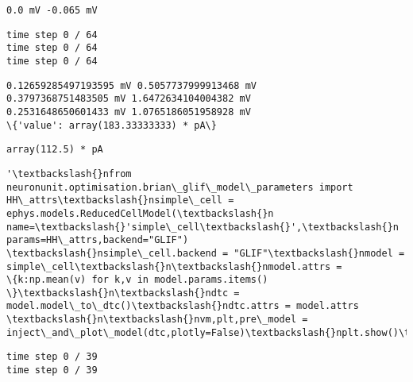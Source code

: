 \documentclass[11pt]{article}
\begin{document}
    \begin{Verbatim}[commandchars=\\\{\}]
0.0 mV -0.065 mV
    \end{Verbatim}

    \begin{Verbatim}[commandchars=\\\{\}]
time step 0 / 64
time step 0 / 64
time step 0 / 64
    \end{Verbatim}

    \begin{Verbatim}[commandchars=\\\{\}]
0.12659285497193595 mV 0.5057737999913468 mV
0.3797368751483505 mV 1.6472634104004382 mV
0.2531648650601433 mV 1.0765186051958928 mV
\{'value': array(183.33333333) * pA\}
    \end{Verbatim}

            \begin{tcolorbox}[breakable, size=fbox, boxrule=.5pt, pad at break*=1mm, opacityfill=0]
\begin{Verbatim}[commandchars=\\\{\}]
array(112.5) * pA
\end{Verbatim}
\end{tcolorbox}
        
            \begin{tcolorbox}[breakable, size=fbox, boxrule=.5pt, pad at break*=1mm, opacityfill=0]
\begin{Verbatim}[commandchars=\\\{\}]
'\textbackslash{}nfrom neuronunit.optimisation.brian\_glif\_model\_parameters import
HH\_attrs\textbackslash{}nsimple\_cell = ephys.models.ReducedCellModel(\textbackslash{}n
name=\textbackslash{}'simple\_cell\textbackslash{}',\textbackslash{}n        params=HH\_attrs,backend="GLIF")
\textbackslash{}nsimple\_cell.backend = "GLIF"\textbackslash{}nmodel = simple\_cell\textbackslash{}n\textbackslash{}nmodel.attrs =
\{k:np.mean(v) for k,v in model.params.items() \}\textbackslash{}n\textbackslash{}ndtc =
model.model\_to\_dtc()\textbackslash{}ndtc.attrs = model.attrs \textbackslash{}n\textbackslash{}nvm,plt,pre\_model =
inject\_and\_plot\_model(dtc,plotly=False)\textbackslash{}nplt.show()\textbackslash{}n'
\end{Verbatim}
\end{tcolorbox}
        
    \begin{Verbatim}[commandchars=\\\{\}]
time step 0 / 39
time step 0 / 39
    \end{Verbatim}
\end{document}
